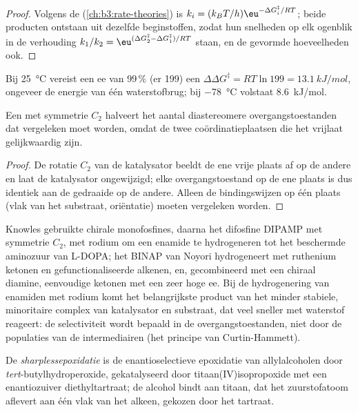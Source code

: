 \begin{proof}
Volgens de  (\cref{ch:b3:rate-theories}) is
$k_i = (k_BT/h)\eu^{-\Delta G_i^\ddagger/RT}$; beide producten ontstaan uit dezelfde beginstoffen, zodat hun
snelheden op elk ogenblik in de verhouding $k_1/k_2 = \eu^{(\Delta G_2^\ddagger - \Delta G_1^\ddagger)/RT}$ staan, en de gevormde hoeveelheden ook.
\end{proof}

Bij \qty{25}{\celsius} vereist een ee van 99\,\% (er 199) een $\Delta\Delta G^\ddagger = RT\ln 199 = \qty{13.1}{kJ/mol}$, ongeveer de energie van één
waterstofbrug; bij \qty{-78}{\celsius} volstaat \qty{8.6}{kJ/mol}.

\begin{proposition}\label{prop:b3:asymmetric-synthesis:c2}
Een  met symmetrie $C_2$ halveert het aantal diastereomere
overgangstoestanden dat vergeleken moet worden, omdat de twee
coördinatieplaatsen die het vrijlaat gelijkwaardig zijn.
\end{proposition}

\begin{proof}
De rotatie $C_2$ van de katalysator beeldt de ene vrije plaats af op de andere en laat de
katalysator ongewijzigd; elke overgangstoestand op de ene plaats is dus
identiek aan de gedraaide op de andere. Alleen de bindingswijzen op één
plaats (vlak van het substraat, oriëntatie) moeten vergeleken worden.
\end{proof}

Knowles gebruikte chirale monofosfines, daarna het difosfine DIPAMP met symmetrie $C_2$, met rodium om
een enamide te hydrogeneren tot het beschermde aminozuur van L-DOPA; het
BINAP van Noyori hydrogeneert met ruthenium ketonen en
gefunctionaliseerde alkenen, en, gecombineerd met een chiraal diamine,
eenvoudige ketonen met een zeer hoge ee. Bij de hydrogenering van
enamiden met rodium komt het belangrijkste product van het minder
stabiele, minoritaire complex van katalysator en substraat, dat veel
sneller met waterstof reageert: de selectiviteit wordt bepaald in de
overgangstoestanden, niet door de populaties van de intermediairen (het
principe van Curtin-Hammett).

\begin{definition}[Sharplessepoxidatie]\label{def:b3:asymmetric-synthesis:sharpless}
De \emph{sharplessepoxidatie} is de
enantioselectieve epoxidatie van allylalcoholen door \textit{tert}-butylhydroperoxide,
gekatalyseerd door titaan(IV)isopropoxide met een enantiozuiver
diethyltartraat; de alcohol bindt aan titaan, dat het zuurstofatoom
aflevert aan één vlak van het alkeen, gekozen door het tartraat.
\end{definition}

